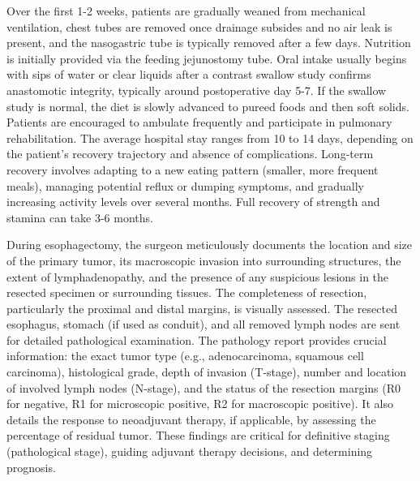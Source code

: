 Over the first 1-2 weeks, patients are gradually weaned from mechanical ventilation, chest tubes are removed once drainage subsides and no air leak is present, and the nasogastric tube is typically removed after a few days. Nutrition is initially provided via the feeding jejunostomy tube. Oral intake usually begins with sips of water or clear liquids after a contrast swallow study confirms anastomotic integrity, typically around postoperative day 5-7. If the swallow study is normal, the diet is slowly advanced to pureed foods and then soft solids. Patients are encouraged to ambulate frequently and participate in pulmonary rehabilitation. The average hospital stay ranges from 10 to 14 days, depending on the patient's recovery trajectory and absence of complications. Long-term recovery involves adapting to a new eating pattern (smaller, more frequent meals), managing potential reflux or dumping symptoms, and gradually increasing activity levels over several months. Full recovery of strength and stamina can take 3-6 months.

During esophagectomy, the surgeon meticulously documents the location and size of the primary tumor, its macroscopic invasion into surrounding structures, the extent of lymphadenopathy, and the presence of any suspicious lesions in the resected specimen or surrounding tissues. The completeness of resection, particularly the proximal and distal margins, is visually assessed. The resected esophagus, stomach (if used as conduit), and all removed lymph nodes are sent for detailed pathological examination. The pathology report provides crucial information: the exact tumor type (e.g., adenocarcinoma, squamous cell carcinoma), histological grade, depth of invasion (T-stage), number and location of involved lymph nodes (N-stage), and the status of the resection margins (R0 for negative, R1 for microscopic positive, R2 for macroscopic positive). It also details the response to neoadjuvant therapy, if applicable, by assessing the percentage of residual tumor. These findings are critical for definitive staging (pathological stage), guiding adjuvant therapy decisions, and determining prognosis.


